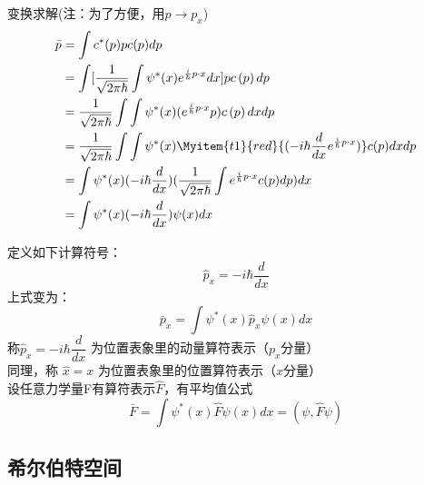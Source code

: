 \begin{frame}
    变换求解(注：为了方便，用$p \to p_x$)
    \begin{equation*}
        \begin{split}
            \bar{p}&=\int c^{*}(p) p c(p) d p \\  
            &=\int [\frac{1}{\sqrt{2 \pi \hbar}} \int \psi^{*}(x) e^{\frac{i}{\hbar} p\cdot x} d x] p c\left(p\right) d p \\
            &=\frac{1}{\sqrt{2 \pi \hbar}} \int \int \psi^{*}(x) (e^{\frac{i}{\hbar} p\cdot x}  p) c\left(p\right) d xd p \\
            &=\frac{1}{\sqrt{2 \pi \hbar}} \int \int \psi^{*}(x) \Myitem{t1}{red}{(-i\hbar\frac{d}{d x} e^{\frac{i}{\hbar} p\cdot x})} c(p) d xd p \\
            &=\int \psi^{*}(x) (-i\hbar\frac{d}{d x}) (\frac{1}{\sqrt{2 \pi \hbar}} \int e^{\frac{i}{\hbar} p\cdot x} c(p) d p)  d x\\
            &=\int \psi^{*}(x) (-i\hbar\frac{d}{d x}) \psi(x)  d x\\
         \end{split}
    \end{equation*}  
\end{frame} 

\begin{frame}
    定义如下计算符号：
    $$ \boxed{\hat{p}_x= -i\hbar\frac{d}{d x}} $$ 
    上式变为：         
    $$\boxed{\bar{p}_x=\int \psi^{*}(x) \hat{p}_x \psi(x) d x} $$
    称$ \hat{p}_x= -i\hbar\dfrac{d}{d x} $ 为位置表象里的动量算符表示（$p_x$分量）\\
    同理，称 $\hat{x}= x $ 为位置表象里的位置算符表示（$x$分量）\\ \vspace{0.3em}
    设任意力学量F有算符表示$\hat{F}$，有平均值公式\\
    $$\boxed{\bar{F}=\int \psi^{*}(x) \hat{F} \psi(x) d x =(\psi, \hat{F} \psi)}$$
\end{frame} 

\subsection{希尔伯特空间}

